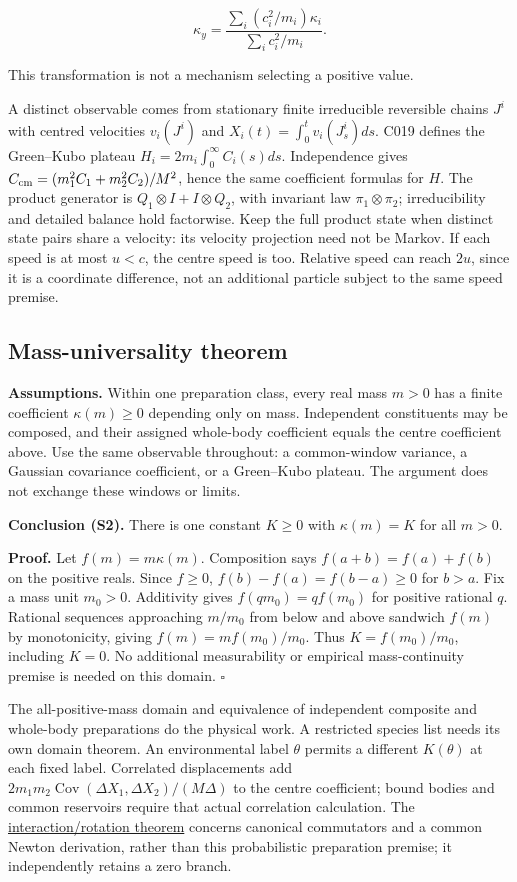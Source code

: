 \documentclass[11pt,a4paper]{article}
\begin{document}
\[\kappa_y=
\frac{\sum_i(c_i^2/m_i)\kappa_i}{\sum_i c_i^2/m_i}.\]

This transformation is not a mechanism selecting a positive value.

A distinct observable comes from stationary finite irreducible
reversible chains \(J^i\) with centred velocities \(v_i(J^i)\) and
\(X_i(t)=\int_0^t v_i(J^i_s)ds\). C019 defines the Green--Kubo plateau
\(H_i=2m_i\int_0^\infty C_i(s)ds\). Independence gives
\(C_{\rm cm}=(m_1^2C_1+m_2^2C_2)/M^2\), hence the same coefficient
formulas for \(H\). The product generator is
\(Q_1\otimes I+I\otimes Q_2\), with invariant law \(\pi_1\otimes\pi_2\);
irreducibility and detailed balance hold factorwise. Keep the full
product state when distinct state pairs share a velocity: its velocity
projection need not be Markov. If each speed is at most \(u<c\), the
centre speed is too. Relative speed can reach \(2u\), since it is a
coordinate difference, not an additional particle subject to the same
speed premise.

\hypertarget{mass-universality-theorem}{%
\subsection{Mass-universality theorem}\label{mass-universality-theorem}}

\textbf{Assumptions.} Within one preparation class, every real mass
\(m>0\) has a finite coefficient \(\kappa(m)\ge0\) depending only on
mass. Independent constituents may be composed, and their assigned
whole-body coefficient equals the centre coefficient above. Use the same
observable throughout: a common-window variance, a Gaussian covariance
coefficient, or a Green--Kubo plateau. The argument does not exchange
these windows or limits.

\textbf{Conclusion (S2).} There is one constant \(K\ge0\) with
\(\kappa(m)=K\) for all \(m>0\).

\textbf{Proof.} Let \(f(m)=m\kappa(m)\). Composition says
\(f(a+b)=f(a)+f(b)\) on the positive reals. Since \(f\ge0\),
\(f(b)-f(a)=f(b-a)\ge0\) for \(b>a\). Fix a mass unit \(m_0>0\).
Additivity gives \(f(qm_0)=qf(m_0)\) for positive rational \(q\).
Rational sequences approaching \(m/m_0\) from below and above sandwich
\(f(m)\) by monotonicity, giving \(f(m)=mf(m_0)/m_0\). Thus
\(K=f(m_0)/m_0\), including \(K=0\). No additional measurability or
empirical mass-continuity premise is needed on this domain. \(\square\)

The all-positive-mass domain and equivalence of independent composite
and whole-body preparations do the physical work. A restricted species
list needs its own domain theorem. An environmental label \(\theta\)
permits a different \(K(\theta)\) at each fixed label. Correlated
displacements add
\(2m_1m_2\operatorname{Cov}(\Delta X_1,\Delta X_2)/(M\Delta)\) to the
centre coefficient; bound bodies and common reservoirs require that
actual correlation calculation. The
\href{rotation-composition-universality.md}{interaction/rotation
theorem} concerns canonical commutators and a common Newton derivation,
rather than this probabilistic preparation premise; it independently
retains a zero branch.
\end{document}
